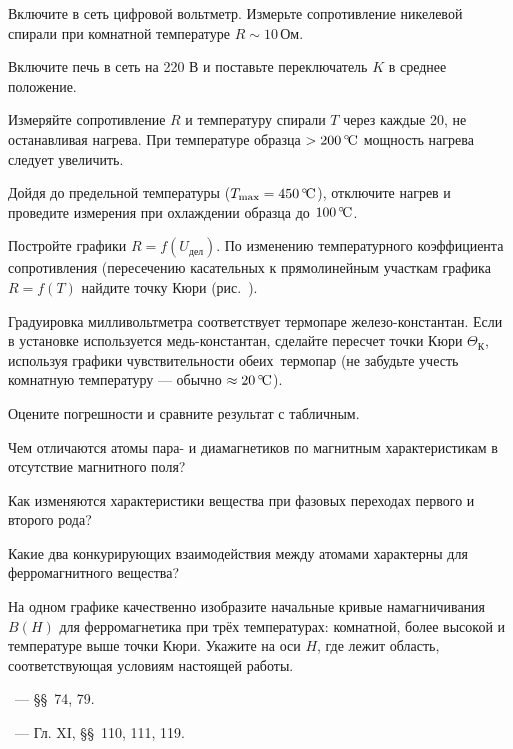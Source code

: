 \begin{lab:task}

    
\item
  Включите в сеть цифровой вольтметр. Измерьте сопротивление никелевой спирали
при комнатной температуре $R \sim 10\,\text{Ом}$.
\item
  Включите печь в сеть на 220 В и поставьте переключатель $K$ в среднее
положение.
\item
  Измеряйте сопротивление $R$ и температуру спирали $T$ через каждые 20\oC,
  не останавливая нагрева. При температуре образца $>200\,^\circ\!\mathrm{C}$ мощность
нагрева следует увеличить.

Дойдя до предельной температуры ($T_\text{max} = 450\,^\circ\!\mathrm{C}$), отключите
нагрев и проведите измерения при охлаждении образца до $100\,^\circ\!\mathrm{C}$.


\item
  Постройте графики $R = f(U_\text{дел})$. По изменению температурного
коэффициента сопротивления (пересечению касательных к прямолинейным участкам
графика $R = f(T)$ найдите точку Кюри (рис.~).
\item
  Градуировка милливольтметра соответствует термопаре железо-кон\-стантан. Если
в установке используется медь-константан, сделайте пересчет точки Кюри
$\Theta_{К}$, используя графики чувствительности \mbox{обеих тер}\-мопар (не
забудьте учесть комнатную температуру --- обычно $\approx20\,^\circ\!\mathrm{C}$).
\item
  Оцените погрешности и сравните результат с табличным.

\end{lab:task}


\begin{lab:questions}

\item
  Чем отличаются атомы пара- и диамагнетиков по магнитным характеристикам в
отсутствие магнитного поля?
\item
  Как изменяются характеристики вещества при фазовых переходах первого и
второго рода?
\item
  Какие два конкурирующих взаимодействия между атомами характерны для
ферромагнитного вещества?
\item
  На одном графике качественно изобразите начальные кривые намагничивания
$B(H)$ для ферромагнетика при трёх температурах: комнатной, более высокой и
температуре выше точки Кюри. Укажите на оси $H$, где лежит область,
соответствующая условиям настоящей работы.

\end{lab:questions}


\begin{lab:literature}
\item \SivuhinIII~--- \S\S~74, 79.
\item \Kalashnikov~--- Гл. XI, \S\S~110, 111, 119.
\end{lab:literature}

